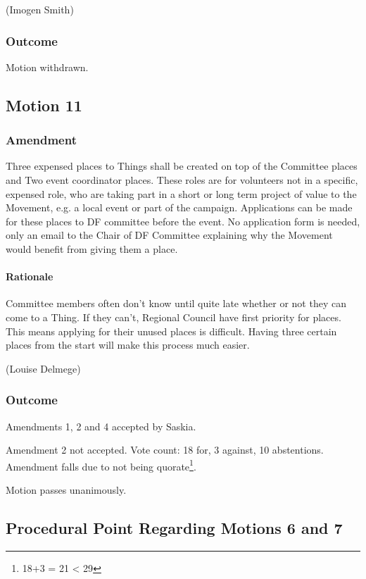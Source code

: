 \documentclass[a4paper, 11pt]{article} %
\begin{document}
(Imogen Smith)

\subsubsection{Outcome}

Motion withdrawn.

\subsection{Motion 11}

\subsubsection{Amendment}

Three expensed places to Things shall be created on top of the Committee places and Two event coordinator places.  These roles are for volunteers not in a specific, expensed role, who are taking part in a short or long term project of value to the Movement, e.g. a local event or part of the campaign.  Applications can be made for these places to DF committee before the event.  No application form is needed, only an email to the Chair of DF Committee explaining why the Movement would benefit from giving them a place.

\paragraph{Rationale}
Committee members often don't know until quite late whether or not they can come to a Thing.  If they can't, Regional Council have first priority for places.  This means applying for their unused places is difficult. Having three certain places from the start will make this process much easier.

(Louise Delmege)

\subsubsection{Outcome}

Amendments 1, 2 and 4 accepted by Saskia.

Amendment 2 not accepted.  Vote count: 18 for, 3 against, 10 abstentions.  Amendment falls due to not being quorate\footnote{18+3 = 21 < 29}.

Motion passes unanimously.

\subsection{Procedural Point Regarding Motions 6 and 7}
\end{document}
